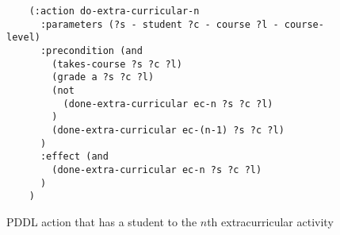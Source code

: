 \begin{figure}[t]
    \begin{lstlisting}
    (:action do-extra-curricular-n
      :parameters (?s - student ?c - course ?l - course-level)
      :precondition (and 
        (takes-course ?s ?c ?l)
        (grade a ?s ?c ?l)
        (not
          (done-extra-curricular ec-n ?s ?c ?l)
        )
        (done-extra-curricular ec-(n-1) ?s ?c ?l)
      )
      :effect (and 
        (done-extra-curricular ec-n ?s ?c ?l)
      )
    )
    \end{lstlisting}
    \caption{PDDL action that has a student to the $n$th extracurricular activity}\label{fig:extra-curricular-n}
\end{figure}